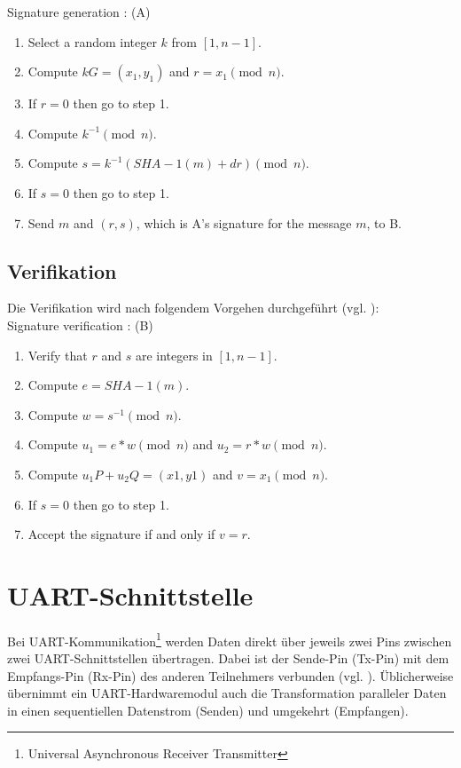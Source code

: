 Signature generation : (A)
\begin{enumerate}
\item Select a random integer $k$ from $[1, n - 1]$.
\item Compute $k G = (x_1, y_1)$ and $r = x_1 \pmod{n} $.
\item If $r = 0$ then go to step 1.
\item Compute $k^{-1} \pmod{n}$.
\item Compute $s = k^{-1}(SHA - 1(m) + dr)\pmod{n}$.
\item If $s = 0$ then go to step 1.
\item Send $m$ and $(r, s)$, which is A’s signature for the message $m$, to B.
\end{enumerate}

\subsection{Verifikation}

Die Verifikation wird nach folgendem Vorgehen durchgeführt (vgl. \cite{hwimp}):\\

Signature verification : (B)
\begin{enumerate}
\item Verify that $r$ and $s$ are integers in $[1, n - 1]$.
\item Compute $e = SHA - 1(m)$.
\item Compute $w = s^{-1}\pmod{n}$.
\item Compute $u_1 = e * w \pmod{n}$ and $u_2 = r * w \pmod{n}$.
\item Compute $u_1 P + u_2 Q = (x1, y1)$ and $v = x_1 \pmod{n}$.
\item If $s = 0$ then go to step 1.
\item Accept the signature if and only if $v = r$.
\end{enumerate}






\section{UART-Schnittstelle} \label{sec:iuart}

Bei UART-Kommunikation\footnote{Universal Asynchronous Receiver Transmitter} werden Daten direkt über jeweils zwei Pins zwischen zwei UART-Schnittstellen übertragen. Dabei ist der Sende-Pin (Tx-Pin) mit dem Empfangs-Pin (Rx-Pin) des anderen Teilnehmers verbunden (vgl. \cite{uart}). Üblicherweise übernimmt ein UART-Hardwaremodul auch die Transformation paralleler Daten in einen sequentiellen Datenstrom (Senden) und umgekehrt (Empfangen). \\

